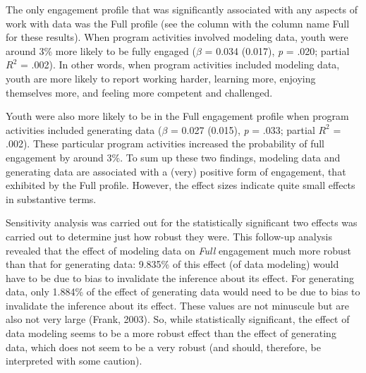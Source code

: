\documentclass[]{book}
\theoremstyle{definition}
\theoremstyle{definition}
\theoremstyle{definition}
\theoremstyle{remark}
\begin{document}
The only engagement profile that was significantly associated with any
aspects of work with data was the Full profile (see the column with the
column name Full for these results). When program activities involved
modeling data, youth were around 3\% more likely to be fully engaged
(\(\beta\) = 0.034 (0.017), \emph{p} = .020; partial \(R^2\) = .002). In
other words, when program activities included modeling data, youth are
more likely to report working harder, learning more, enjoying themselves
more, and feeling more competent and challenged.

Youth were also more likely to be in the Full engagement profile when
program activities included generating data (\(\beta\) = 0.027 (0.015),
\emph{p} = .033; partial \(R^2\) = .002). These particular program
activities increased the probability of full engagement by around 3\%.
To sum up these two findings, modeling data and generating data are
associated with a (very) positive form of engagement, that exhibited by
the Full profile. However, the effect sizes indicate quite small effects
in substantive terms.

Sensitivity analysis was carried out for the statistically significant
two effects was carried out to determine just how robust they were. This
follow-up analysis revealed that the effect of modeling data on
\emph{Full} engagement much more robust than that for generating data:
9.835\% of this effect (of data modeling) would have to be due to bias
to invalidate the inference about its effect. For generating data, only
1.884\% of the effect of generating data would need to be due to bias to
invalidate the inference about its effect. These values are not
minuscule but are also not very large (Frank, 2003). So, while
statistically significant, the effect of data modeling seems to be a
more robust effect than the effect of generating data, which does not
seem to be a very robust (and should, therefore, be interpreted with
some caution).
\end{document}
